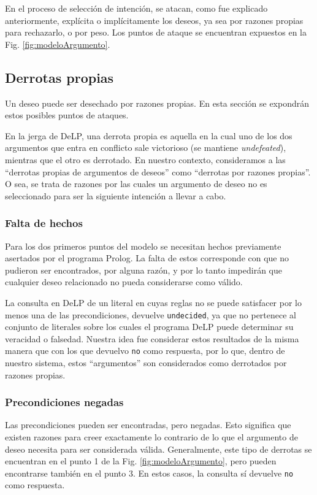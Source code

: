 \documentclass[oneside]{book}
\begin{document}
En el proceso de selección de intención, se atacan, como fue explicado anteriormente,
explícita o implícitamente los deseos, ya sea por razones propias 
para rechazarlo, o por peso. Los puntos de ataque se encuentran expuestos en la Fig. 
\ref{fig:modeloArgumento}.

\subsection{Derrotas propias}

Un deseo puede ser desechado por razones propias. En esta sección se expondrán estos
posibles puntos de ataques.

En la jerga de DeLP, una derrota propia es aquella en la cual uno de los dos 
argumentos que entra en conflicto sale victorioso (se mantiene \emph{undefeated}),
mientras que el otro es derrotado. En nuestro contexto, consideramos a las 
``derrotas propias de argumentos de deseos'' como ``derrotas por razones propias''. 
O sea, se trata de razones por las cuales un argumento de deseo no es seleccionado
para ser la siguiente intención a llevar a cabo.

\subsubsection{Falta de hechos}

\label{sec:faltaDeHechos}

Para los dos primeros puntos del modelo se necesitan hechos previamente asertados 
por el programa Prolog. La falta de estos corresponde con que no pudieron ser 
encontrados, por alguna razón, y por lo tanto impedirán que cualquier deseo 
relacionado no pueda considerarse como válido.

La consulta en DeLP de un literal en cuyas reglas no se puede satisfacer por lo
menos una de las precondiciones, devuelve 
\texttt{undecided}, ya que no pertenece al conjunto de literales sobre los cuales
el programa DeLP puede determinar su veracidad o falsedad. Nuestra idea fue 
considerar estos resultados de la misma manera que con los que devuelvo \texttt{no}
como respuesta, por lo que, dentro de nuestro sistema, estos ``argumentos'' son
considerados como derrotados por razones propias.

\subsubsection{Precondiciones negadas}

Las precondiciones pueden ser encontradas, pero negadas. Esto significa que existen
razones para creer exactamente lo contrario de lo que el argumento de deseo 
necesita para ser considerada válida. Generalmente, este tipo de derrotas se 
encuentran en el punto 1 de la Fig. \ref{fig:modeloArgumento}, pero pueden 
encontrarse también en el punto 3. En estos casos, la consulta sí devuelve 
\texttt{no} como respuesta.
\end{document}
